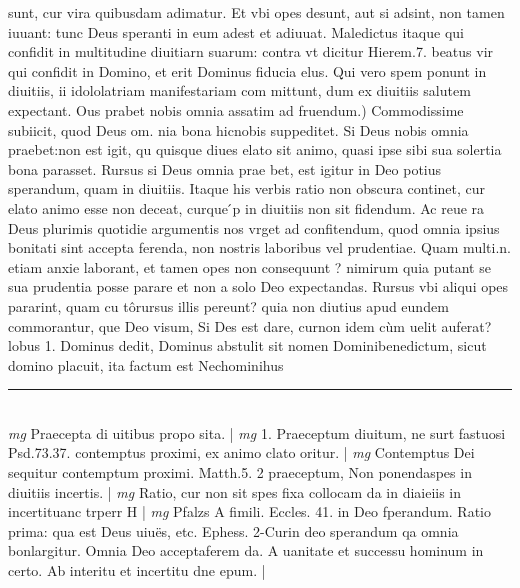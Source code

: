 \documentclass{article}
\begin{document}
\begin{pages}
sunt, cur vira quibusdam adimatur. Et vbi opes desunt, aut si adsint, non tamen iuuant: tunc Deus speranti in eum adest et adiuuat. Maledictus itaque qui confidit in multitudine diuitiarn suarum: contra vt dicitur Hierem.7. beatus vir qui confidit in Domino, et erit Dominus fiducia elus. Qui vero spem ponunt in diuitiis, ii idololatriam manifestariam com mittunt, dum ex diuitiis salutem expectant.  \pend\pstart Ous prabet nobis omnia assatim ad fruendum.) Commodissime subiicit, quod Deus om. nia bona hicnobis suppeditet. Si Deus nobis omnia praebet:non est igit, qu quisque diues elato sit animo, quasi ipse sibi sua solertia bona parasset. Rursus si Deus omnia prae bet, est igitur in Deo potius sperandum, quam in diuitiis. Itaque his verbis ratio non obscura continet, cur elato animo esse non deceat, curque ́p in diuitiis non sit fidendum. Ac reue ra Deus plurimis quotidie argumentis nos vrget ad confitendum, quod omnia ipsius bonitati sint accepta ferenda, non nostris laboribus vel prudentiae. Quam multi.n. etiam anxie laborant, et tamen opes non consequunt ? nimirum quia putant se sua prudentia posse parare et non a solo Deo expectandas. Rursus vbi aliqui opes pararint, quam cu tôrursus illis pereunt? quia non diutius apud eundem commorantur, que Deo visum, Si Des est dare, curnon idem cùm uelit auferat? lobus 1. Dominus dedit, Dominus abstulit sit nomen Dominibenedictum, sicut domino placuit, ita factum est Nechominihus  \pend
\vspace{0.5cm}\noindent
\vspace{0.2cm}\rule{1cm}{0.2pt}\\ 
\hspace{0.2cm}\textit{mg}
\footnotesize Praecepta di uitibus propo sita. 
\normalsize| 
\hspace{0.2cm}\textit{mg}
\footnotesize 1. Praeceptum diuitum, ne surt fastuosi Psd.73.37. contemptus proximi, ex animo clato oritur. 
\normalsize| 
\hspace{0.2cm}\textit{mg}
\footnotesize Contemptus Dei sequitur contemptum proximi. Matth.5. 2 praeceptum, Non ponendaspes in diuitiis incertis. 
\normalsize| 
\hspace{0.2cm}\textit{mg}
\footnotesize Ratio, cur non sit spes fixa collocam da in diaieiis in incertituanc trperr H 
\normalsize| 
\hspace{0.2cm}\textit{mg}
\footnotesize Pfalzs A fimili. Eccles. 41. in Deo fperandum. Ratio prima: qua est Deus uiuës, etc. Ephess. 2-Curin deo sperandum qa omnia bonlargitur. Omnia Deo acceptaferem da. A uanitate et successu hominum in certo. Ab interitu et incertitu dne epum. 
\normalsize| 

\end{pages}
\end{document}
